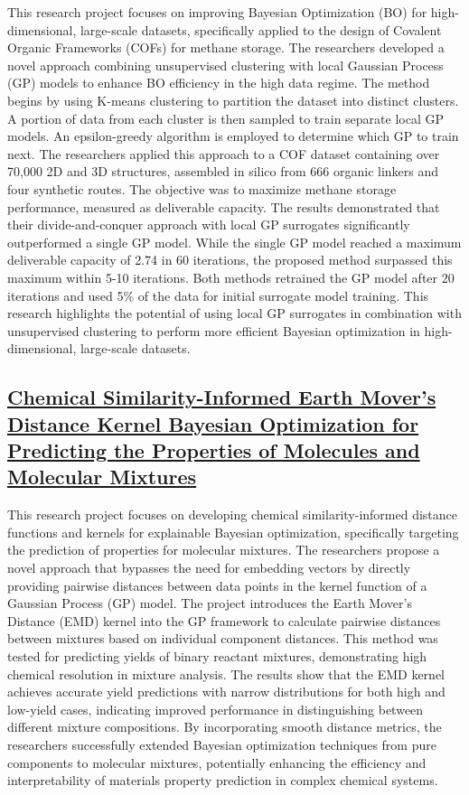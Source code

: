 This research project focuses on improving Bayesian Optimization (BO) for high-dimensional, large-scale datasets, specifically applied to the design of Covalent Organic Frameworks (COFs) for methane storage\cite{deshwal_bayesian_2021}. The researchers developed a novel approach combining unsupervised clustering with local Gaussian Process (GP) models to enhance BO efficiency in the high data regime. The method begins by using K-means clustering to partition the dataset into distinct clusters. A portion of data from each cluster is then sampled to train separate local GP models. An epsilon-greedy algorithm is employed to determine which GP to train next. The researchers applied this approach to a COF dataset containing over 70,000 2D and 3D structures, assembled in silico from 666 organic linkers and four synthetic routes. The objective was to maximize methane storage performance, measured as deliverable capacity. The results demonstrated that their divide-and-conquer approach with local GP surrogates significantly outperformed a single GP model. While the single GP model reached a maximum deliverable capacity of 2.74 in 60 iterations, the proposed method surpassed this maximum within 5-10 iterations. Both methods retrained the GP model after 20 iterations and used 5\% of the data for initial surrogate model training. This research highlights the potential of using local GP surrogates in combination with unsupervised clustering to perform more efficient Bayesian optimization in high-dimensional, large-scale datasets.
 \subsection*{\href{https://www.youtube.com/watch?v=I179UR8P054}{Chemical Similarity-Informed Earth Mover’s Distance Kernel Bayesian Optimization for Predicting the Properties of Molecules and Molecular Mixtures}}

This research project focuses on developing chemical similarity-informed distance functions and kernels for explainable Bayesian optimization, specifically targeting the prediction of properties for molecular mixtures. The researchers propose a novel approach that bypasses the need for embedding vectors by directly providing pairwise distances between data points in the kernel function of a Gaussian Process (GP) model\cite{moss_gaussian_2020}. The project introduces the Earth Mover's Distance (EMD) kernel\cite{hargreaves_earth_2020} into the GP framework to calculate pairwise distances between mixtures based on individual component distances. This method was tested for predicting yields of binary reactant mixtures, demonstrating high chemical resolution in mixture analysis. The results show that the EMD kernel achieves accurate yield predictions with narrow distributions for both high and low-yield cases, indicating improved performance in distinguishing between different mixture compositions. By incorporating smooth distance metrics, the researchers successfully extended Bayesian optimization techniques from pure components to molecular mixtures, potentially enhancing the efficiency and interpretability of materials property prediction in complex chemical systems.
